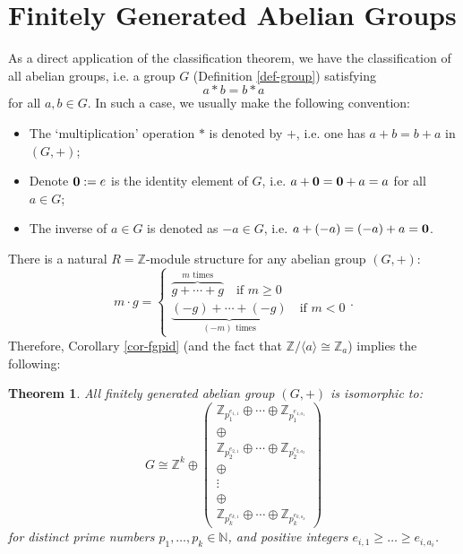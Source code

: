\documentclass[11pt,openany]{book}
\theoremstyle{plain}
\newtheorem{theorem}{Theorem}[chapter]
\theoremstyle{definition}
\theoremstyle{remark}
\begin{document}
\section{Finitely Generated Abelian Groups}
As a direct application of the classification theorem, we have the classification of all abelian groups, i.e. a group $G$ (Definition \ref{def-group}) satisfying 
$$a \ast b = b \ast a$$
for all $a, b \in G$. In such a case, we usually make the following convention:
\begin{itemize}
    \item The `multiplication' operation $\ast$ is denoted by $+$, i.e. one has $a + b = b + a$ in $(G,+)$; 
    \item Denote ${\bf 0} := e$ is the identity element of $G$, i.e. $a + {\bf 0} = {\bf 0} + a = a$ for all $a \in G$;
    \item The inverse of $a \in G$ is denoted as $-a \in G$, i.e. $a + (-a) = (-a) + a = {\bf 0}$.
\end{itemize}

There is a natural $R=\mathbb{Z}$-module structure for any abelian group $(G,+)$:
$$m\cdot g = \begin{cases}
    \overbrace{g+\cdots+g}^{m\text{ times}}\quad\text{if }m\geq 0\\
    \underbrace{(-g)+\cdots+(-g)}_{(-m)\text{ times}}\quad\text{if }m<0
\end{cases}.$$
Therefore, Corollary \ref{cor-fgpid} (and the fact that $\mathbb{Z}/\langle a \rangle \cong \mathbb{Z}_{a}$) implies the following:
\begin{theorem}
    All finitely generated abelian group $(G,+)$ is isomorphic to:
$$G \cong \mathbb{Z}^k \oplus \begin{pmatrix} \mathbb{Z}_{p_1^{e_{1,1}}} \oplus \cdots \oplus \mathbb{Z}_{p_1^{e_{1,a_1}}}\\ 
\oplus \\
\mathbb{Z}_{p_2^{e_{2,1}}} \oplus \cdots \oplus \mathbb{Z}_{p_2^{e_{2,a_2}}}\\
\oplus \\
\vdots \\
\oplus \\
\mathbb{Z}_{p_k^{e_{k,1}}} \oplus \cdots \oplus \mathbb{Z}_{p_k^{e_{k,a_k}}} \end{pmatrix}$$
for distinct prime numbers $p_1, \dots, p_k \in \mathbb{N}$, and positive integers $e_{i,1} \geq \dots \geq e_{i,a_i}$.
\end{theorem}
\end{document}
